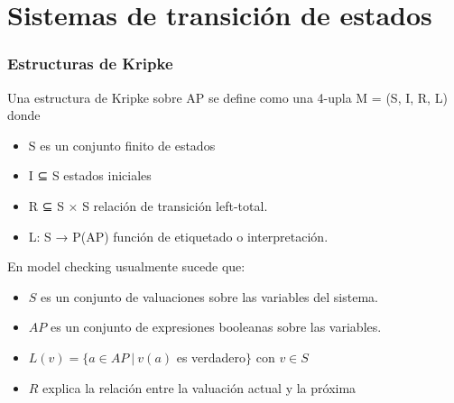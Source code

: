 \documentclass[serif]{beamer}
\begin{document}


\section[Teoría]{Sistemas de transición de estados}

\begin{frame}
\frametitle{Estructuras de Kripke}
Una estructura de Kripke sobre AP se define
como una 4-upla M = (S, I, R, L) donde\\[0.5cm]
\begin{itemize}
\item S es un conjunto finito de estados
\item I ⊆ S estados iniciales
\item R ⊆ S × S relación de transición left-total.
\item L: S → P(AP) función de etiquetado o
interpretación.
\end{itemize}
\end{frame}

\begin{frame}

En model checking usualmente sucede que:\\[0.5cm]
\begin{itemize}
\item $S$ es un conjunto de valuaciones sobre las variables del sistema.
\item $AP$ es un conjunto de expresiones booleanas sobre las variables.
\item $L(v) = \lbrace a \in AP~|~v(a)$ es verdadero$\rbrace$ con $v \in S$
\item $R$ explica la relación entre la valuación actual y la próxima
\end{itemize}

\end{frame}
\end{document}
